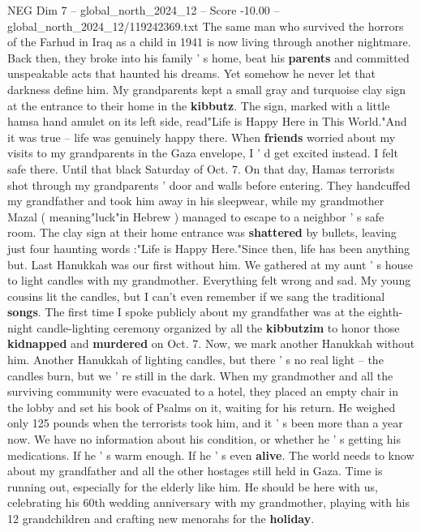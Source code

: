 \begin{textsample}{NEG Dim 7 – global\_north\_2024\_12 – Score -10.00 – global\_north\_2024\_12/119242369.txt}  \label{ex:f7_neg_156}
The same man who survived the horrors of the Farhud in Iraq as a child in 1941 is now living through another nightmare.
Back then, they broke into his family ' s home, beat his \textbf{parents} and committed unspeakable acts that haunted his dreams.
Yet somehow he never let that darkness define him.
My grandparents kept a small gray and turquoise clay sign at the entrance to their home in the \textbf{kibbutz}.
The sign, marked with a little hamsa hand amulet on its left side, read"Life is Happy Here in This World."And it was true -- life was genuinely happy there.
When \textbf{friends} worried about my visits to my grandparents in the Gaza envelope, I ' d get excited instead.
I felt safe there.
Until that black Saturday of Oct. 7.
On that day, Hamas terrorists shot through my grandparents ' door and walls before entering.
They handcuffed my grandfather and took him away in his sleepwear, while my grandmother Mazal ( meaning"luck"in Hebrew ) managed to escape to a neighbor ' s safe room.
The clay sign at their home entrance was \textbf{shattered} by bullets, leaving just four haunting words :"Life is Happy Here."Since then, life has been anything but.
Last Hanukkah was our first without him.
We gathered at my aunt ' s house to light candles with my grandmother.
Everything felt wrong and sad.
My young cousins lit the candles, but I can't even remember if we sang the traditional \textbf{songs}.
The first time I spoke publicly about my grandfather was at the eighth-night candle-lighting ceremony organized by all the \textbf{kibbutzim} to honor those \textbf{kidnapped} and \textbf{murdered} on Oct. 7.
Now, we mark another Hanukkah without him.
Another Hanukkah of lighting candles, but there ' s no real light -- the candles burn, but we ' re still in the dark.
When my grandmother and all the surviving community were evacuated to a hotel, they placed an empty chair in the lobby and set his book of Psalms on it, waiting for his return.
He weighed only 125 pounds when the terrorists took him, and it ' s been more than a year now.
We have no information about his condition, or whether he ' s getting his medications.
If he ' s warm enough.
If he ' s even \textbf{alive}.
The world needs to know about my grandfather and all the other hostages still held in Gaza.
Time is running out, especially for the elderly like him.
He should be here with us, celebrating his 60th wedding anniversary with my grandmother, playing with his 12 grandchildren and crafting new menorahs for the \textbf{holiday}.

\end{textsample}
